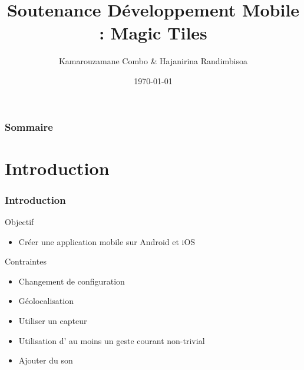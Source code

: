 \documentclass{beamer}
\title[Magic Tiles]{Soutenance Développement Mobile : Magic Tiles} %
\author{Kamarouzamane Combo \& Hajanirina Randimbisoa} %
\institute{\normalsize{M1 Informatique Université de la Réunion}}
\date{\today} %
\begin{document}
\begin{frame}
\titlepage %
\end{frame}

\begin{frame}
\frametitle{Sommaire} %
\tableofcontents %
\end{frame}


\section{Introduction}



\begin{frame}
  \frametitle{Introduction}
  \begin{block}{Objectif}
    \begin{itemize}
    \item {Créer une application mobile sur Android et iOS}
    \end{itemize}
  \end{block}
    \begin{block}{Contraintes}
    \begin{itemize}
    \item {Changement de configuration}
    \item {Géolocalisation}
    \item {Utiliser un capteur}
    \item {Utilisation d' au moins un geste courant non-trivial}
    \item {Ajouter du son}
    \end{itemize}
  \end{block}
\end{frame}
\end{document}
